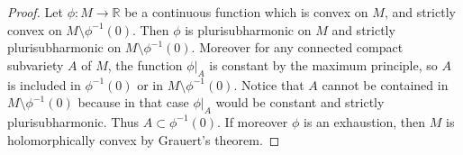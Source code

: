 \documentclass[10pt,a4paper]{amsart}
\newcommand{\R}{\mathbb{R}}
\begin{document}
\begin{proof}
	Let $\phi:M\to \R$ be a continuous function which is convex on $M$, and strictly convex on $M\setminus \phi^{-1}(0)$. Then $\phi$ is plurisubharmonic on $M$ and strictly plurisubharmonic on $M\setminus \phi^{-1}(0)$.  Moreover for any connected compact subvariety $A$ of $M$, the function $\phi\vert_{A}$ is constant by the maximum principle, so $A$ is included in $\phi^{-1}(0)$ or in $M\setminus \phi^{-1}(0)$. Notice that $A$ cannot be contained in $M\setminus \phi^{-1}(0)$ because in that case $\phi\vert_{A}$ would be constant and strictly plurisubharmonic. Thus $A\subset \phi^{-1}(0)$. If moreover $\phi$ is an exhaustion, then $M$ is holomorphically convex by Grauert's theorem.
\end{proof}
\end{document}
